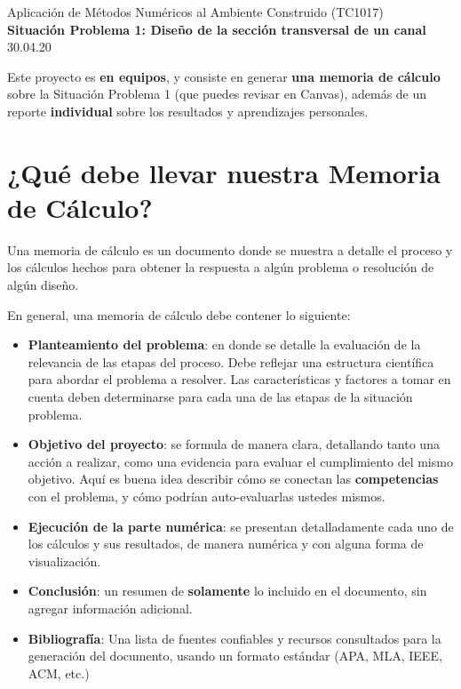 \documentclass[]{article}
\theoremstyle{definition}
\begin{document}
\begin{center}
{\huge Aplicación de Métodos Numéricos al Ambiente Construido (TC1017)}\\[1.5ex]
{\large \textbf{Situación Problema 1: Diseño de la sección transversal de un canal}\\[1.5ex] %
30.04.20} %
\end{center}

\vspace{0.2 cm}

{%
\small
Este proyecto es \textbf{en equipos}, y consiste en generar \textbf{una memoria de cálculo} sobre la Situación Problema 1 (que puedes revisar en Canvas), además de un reporte \textbf{individual} sobre los resultados y aprendizajes personales.
}

\bigskip

\section{¿Qué debe llevar nuestra Memoria de Cálculo?}

Una memoria de cálculo es un documento donde se muestra a detalle el proceso y los cálculos hechos para obtener la respuesta a algún problema o resolución de algún diseño.

\bigskip

En general, una memoria de cálculo debe contener lo siguiente:

\begin{itemize}
    \item \textbf{Planteamiento del problema}: en donde se detalle la evaluación de la relevancia de las etapas del proceso. Debe reflejar una estructura científica para abordar el problema a resolver. Las características y factores a tomar en cuenta deben determinarse para cada una de las etapas de la situación problema.
    \item \textbf{Objetivo del proyecto}: se formula de manera clara, detallando tanto una acción a realizar, como una evidencia para evaluar el cumplimiento del mismo objetivo. Aquí es buena idea describir cómo se conectan las \textbf{competencias} con el problema, y cómo podrían auto-evaluarlas ustedes mismos.
    \item \textbf{Ejecución de la parte numérica}: se presentan detalladamente cada uno de los cálculos y sus resultados, de manera numérica y con alguna forma de visualización.
    \item \textbf{Conclusión}: un resumen de \textbf{solamente} lo incluido en el documento, sin agregar información adicional.
    \item \textbf{Bibliografía}: Una lista de fuentes confiables y recursos consultados para la generación del documento, usando un formato estándar (APA, MLA, IEEE, ACM, etc.)
\end{itemize}
\end{document}
